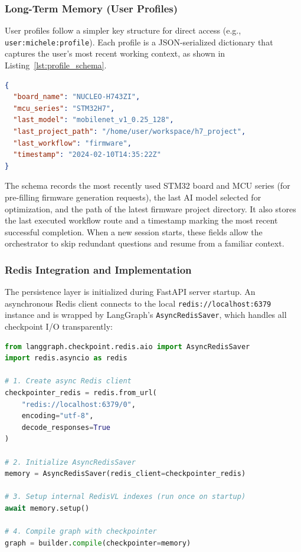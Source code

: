 \subsubsection{Long-Term Memory (User Profiles)}

User profiles follow a simpler key structure for direct access (e.g., \texttt{user:michele:profile}). Each profile is a JSON-serialized dictionary that captures the user's most recent working context, as shown in Listing~\ref{lst:profile_schema}.

\begin{lstlisting}[language=json, caption={User profile schema stored in Redis}, label={lst:profile_schema}]
{
  "board_name": "NUCLEO-H743ZI",
  "mcu_series": "STM32H7",
  "last_model": "mobilenet_v1_0.25_128",
  "last_project_path": "/home/user/workspace/h7_project",
  "last_workflow": "firmware",
  "timestamp": "2024-02-10T14:35:22Z"
}
\end{lstlisting}

The schema records the most recently used STM32 board and MCU series (for pre-filling firmware generation requests), the last AI model selected for optimization, and the path of the latest firmware project directory. It also stores the last executed workflow route and a timestamp marking the most recent successful completion. When a new session starts, these fields allow the orchestrator to skip redundant questions and resume from a familiar context.

\subsubsection{Redis Integration and Implementation}

The persistence layer is initialized during FastAPI server startup. An asynchronous Redis client connects to the local \texttt{redis://localhost:6379} instance and is wrapped by LangGraph's \texttt{AsyncRedisSaver}, which handles all checkpoint I/O transparently:

\begin{lstlisting}[language=Python, caption={Redis checkpointer initialization in server.py}, label={lst:redis_init}]
from langgraph.checkpoint.redis.aio import AsyncRedisSaver
import redis.asyncio as redis

# 1. Create async Redis client
checkpointer_redis = redis.from_url(
    "redis://localhost:6379/0",
    encoding="utf-8",
    decode_responses=True
)

# 2. Initialize AsyncRedisSaver
memory = AsyncRedisSaver(redis_client=checkpointer_redis)

# 3. Setup internal RedisVL indexes (run once on startup)
await memory.setup()

# 4. Compile graph with checkpointer
graph = builder.compile(checkpointer=memory)
\end{lstlisting}

